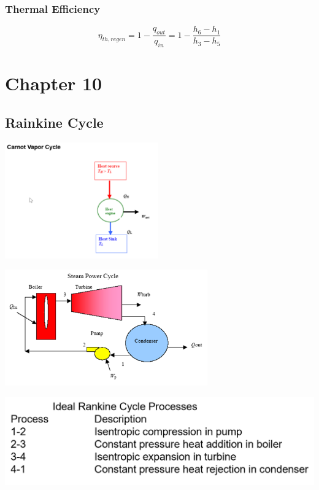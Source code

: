 \documentclass[10pt,landscape]{article}
\newenvironment{Figure}
     {\par\medskip\noindent\minipage{\linewidth}}
     {\endminipage\par\medskip}
\begin{document}
\begin{multicols}{3}
\subsubsection{Thermal Efficiency}
\begin{equation}
    \eta_{th,regen}=1-\frac{q_{out}}{q_{in}}=1-\frac{h_6-h_1}{h_3-h_5}
\end{equation}

\section{Chapter 10}
\subsection{Rainkine Cycle}
\begin{Figure}
    \centering
    \includegraphics[width=\linewidth, height=5cm]{Carnot_VaporCycle.png}
\end{Figure}
\begin{Figure}
    \centering
    \includegraphics[width=\linewidth, height=5cm]{SteamPowerCycle.png}
\end{Figure}
\begin{Figure}
    \centering
    \includegraphics[width=\linewidth]{RankineCycleProcess.png}
\end{Figure}


\end{multicols}
\end{document}
